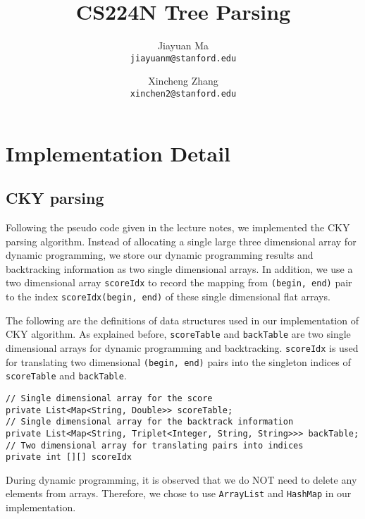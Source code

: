 \documentclass[letterpaper]{article}
\begin{document}
\title{CS224N Tree Parsing}
\author{
	Jiayuan Ma \\
	\texttt{jiayuanm@stanford.edu}
	\and
	Xincheng Zhang\\
	\texttt{xinchen2@stanford.edu}
}
\maketitle


\section{Implementation Detail}

\subsection{CKY parsing}
Following the pseudo code given in the lecture notes, we implemented the CKY parsing algorithm.  Instead of allocating a single large three dimensional array for dynamic programming, we store our dynamic programming results and backtracking information as two single dimensional arrays. 
In addition, we use a two dimensional array \texttt{scoreIdx} to record the mapping from \texttt{(begin, end)} pair to the index \texttt{scoreIdx(begin, end)} of these single dimensional flat arrays.

\vspace{0.25cm}

The following are the definitions of data structures used in our implementation of CKY algorithm. As explained before,
\texttt{scoreTable} and \texttt{backTable} are two single dimensional arrays for dynamic programming and backtracking. \texttt{scoreIdx} is used for translating two dimensional \texttt{(begin, end)} pairs into the singleton indices of \texttt{scoreTable} and \texttt{backTable}.

\begin{verbatim}
// Single dimensional array for the score
private List<Map<String, Double>> scoreTable;
// Single dimensional array for the backtrack information
private List<Map<String, Triplet<Integer, String, String>>> backTable;
// Two dimensional array for translating pairs into indices
private int [][] scoreIdx
\end{verbatim}

During dynamic programming, it is observed that we do NOT need to delete any elements from arrays. Therefore, we chose to use \texttt{ArrayList} and \texttt{HashMap} in our implementation.
\end{document}

